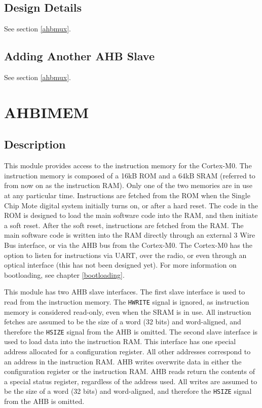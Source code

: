 \subsection{Design Details}
See section \ref{ahbmux}.

\subsection{Adding Another AHB Slave}
See section \ref{ahbmux}.

\section{AHBIMEM} \label{AHBIMEM}
\subsection{Description}
This module provides access to the instruction memory for the Cortex-M0. The instruction memory is composed of a 16kB ROM and a 64kB SRAM (referred to from now on as the instruction RAM). Only one of the two memories are in use at any particular time. Instructions are fetched from the ROM when the Single Chip Mote digital system initially turns on, or after a hard reset. The code in the ROM is designed to load the main software code into the RAM, and then initiate a soft reset. After the soft reset, instructions are fetched from the RAM. The main software code is written into the RAM directly through an external 3 Wire Bus interface, or via the AHB bus from the Cortex-M0. The Cortex-M0 has the option to listen for instructions via UART, over the radio, or even through an optical interface (this has not been designed yet). For more information on bootloading, see chapter \ref{bootloading}.

This module has two AHB slave interfaces. The first slave interface is used to read from the instruction memory. The \texttt{HWRITE} signal is ignored, as instruction memory is considered read-only, even when the SRAM is in use. All instruction fetches are assumed to be the size of a word (32 bits) and word-aligned, and therefore the \texttt{HSIZE} signal from the AHB is omitted. The second slave interface is used to load data into the instruction RAM. This interface has one special address allocated for a configuration register. All other addresses correspond to an address in the instruction RAM. AHB writes overwrite data in either the configuration register or the instruction RAM. AHB reads return the contents of a special status register, regardless of the address used. All writes are assumed to be the size of a word (32 bits) and word-aligned, and therefore the \texttt{HSIZE} signal from the AHB is omitted.

